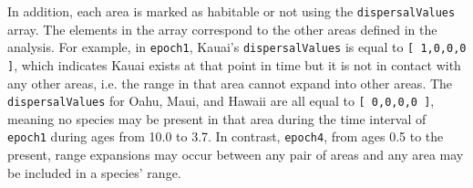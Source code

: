 In addition, each area is marked as habitable or not using the {\tt dispersalValues} array.
The elements in the array correspond to the other areas defined in the analysis.
For example, in {\tt epoch1}, Kauai's {\tt dispersalValues} is equal to {\tt [ 1,0,0,0 ]}, which indicates Kauai exists at that point in time but it is not in contact with any other areas, i.e. the range in that area cannot expand into other areas.
The {\tt dispersalValues} for Oahu, Maui, and Hawaii are all equal to {\tt [ 0,0,0,0 ]}, meaning no species may be present in that area during the time interval of {\tt epoch1} during ages from 10.0 to 3.7. In contrast, {\tt epoch4}, from ages 0.5 to the present, range expansions may occur between any pair of areas and any area may be included in a species' range.




